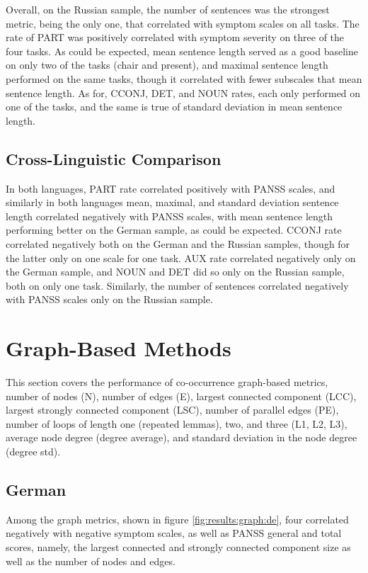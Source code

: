 Overall, on the Russian sample, the number of sentences was the strongest metric, being the only one, that correlated with symptom scales on all tasks. The rate of PART was positively correlated with symptom severity on three of the four tasks. As could be expected, mean sentence length served as a good baseline on only two of the tasks (chair and	present), and maximal sentence length performed on the same tasks, though it correlated with fewer subscales that mean sentence length. As for, CCONJ, DET, and NOUN rates, each only performed on one of the tasks, and the same is true of standard deviation in mean sentence length.

\subsection{Cross-Linguistic Comparison}
In both languages, PART rate correlated positively with PANSS scales, and similarly in both languages mean, maximal, and standard deviation sentence length correlated negatively with PANSS scales, with mean sentence length performing better on the German sample, as could be expected. CCONJ rate correlated negatively both on the German and the Russian samples, though for the latter only on one scale for one task. AUX rate correlated negatively only on the German sample, and NOUN and DET did so only on the Russian sample, both on only one task. Similarly, the number of sentences correlated negatively with PANSS scales only on the Russian sample.



\clearpage
\section{Graph-Based Methods}
\label{sec:results:clinical:graph}
This section covers the performance of co-occurrence graph-based metrics, number of nodes (N), number of edges (E), largest connected component (LCC), largest strongly connected component (LSC), number of parallel edges (PE), number of loops of length one (repeated lemmas), two, and three (L1, L2, L3), average node degree (degree average), and standard deviation in the node degree (degree std).  


\subsection{German}
Among the graph metrics, shown in figure \ref{fig:results:graph:de}, four correlated negatively with negative symptom scales, as well as PANSS general and total scores, namely, the largest connected and strongly connected component size as well as the number of nodes and edges. 

